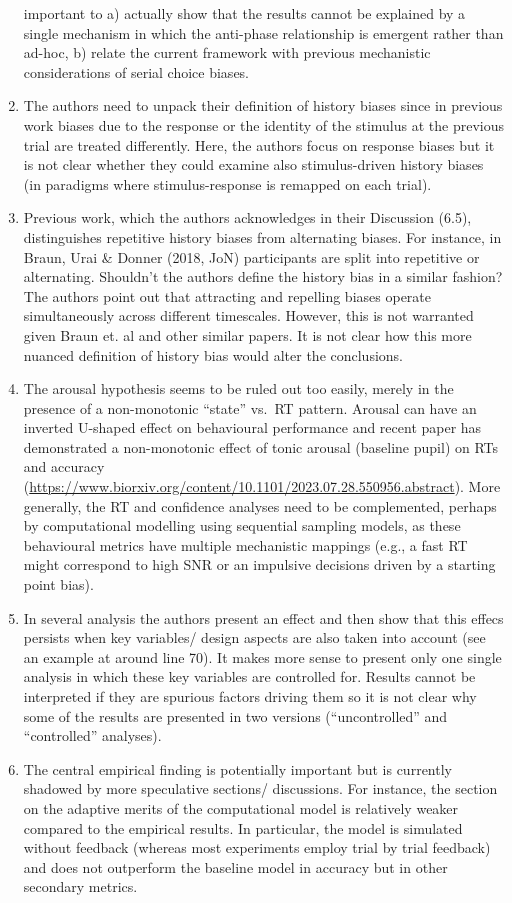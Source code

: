 \documentclass[
]{article}
\begin{document}
\begin{enumerate}
  important to a) actually show that the results cannot be explained by
  a single mechanism in which the anti-phase relationship is emergent
  rather than ad-hoc, b) relate the current framework with previous
  mechanistic considerations of serial choice biases.
\item
  The authors need to unpack their definition of history biases since in
  previous work biases due to the response or the identity of the
  stimulus at the previous trial are treated differently. Here, the
  authors focus on response biases but it is not clear whether they
  could examine also stimulus-driven history biases (in paradigms where
  stimulus-response is remapped on each trial).
\item
  Previous work, which the authors acknowledges in their Discussion
  (6.5), distinguishes repetitive history biases from alternating
  biases. For instance, in Braun, Urai \& Donner (2018, JoN)
  participants are split into repetitive or alternating. Shouldn't the
  authors define the history bias in a similar fashion? The authors
  point out that attracting and repelling biases operate simultaneously
  across different timescales. However, this is not warranted given
  Braun et. al and other similar papers. It is not clear how this more
  nuanced definition of history bias would alter the conclusions.
\item
  The arousal hypothesis seems to be ruled out too easily, merely in the
  presence of a non-monotonic ``state'' vs.~RT pattern. Arousal can have
  an inverted U-shaped effect on behavioural performance and recent
  paper has demonstrated a non-monotonic effect of tonic arousal
  (baseline pupil) on RTs and accuracy
  (\url{https://www.biorxiv.org/content/10.1101/2023.07.28.550956.abstract}).
  More generally, the RT and confidence analyses need to be
  complemented, perhaps by computational modelling using sequential
  sampling models, as these behavioural metrics have multiple
  mechanistic mappings (e.g., a fast RT might correspond to high SNR or
  an impulsive decisions driven by a starting point bias).
\item
  In several analysis the authors present an effect and then show that
  this effecs persists when key variables/ design aspects are also taken
  into account (see an example at around line 70). It makes more sense
  to present only one single analysis in which these key variables are
  controlled for. Results cannot be interpreted if they are spurious
  factors driving them so it is not clear why some of the results are
  presented in two versions (``uncontrolled'' and ``controlled''
  analyses).
\item
  The central empirical finding is potentially important but is
  currently shadowed by more speculative sections/ discussions. For
  instance, the section on the adaptive merits of the computational
  model is relatively weaker compared to the empirical results. In
  particular, the model is simulated without feedback (whereas most
  experiments employ trial by trial feedback) and does not outperform
  the baseline model in accuracy but in other secondary metrics.
\end{enumerate}
\end{document}
